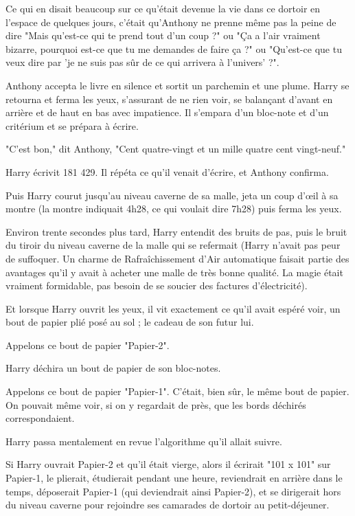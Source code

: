 Ce qui en disait beaucoup sur ce qu'était devenue la vie dans ce dortoir en l'espace de quelques jours, c'était qu'Anthony ne prenne même pas la peine de dire "Mais qu'est-ce qui te prend tout d'un coup ?" ou "Ça a l'air vraiment bizarre, pourquoi est-ce que tu me demandes de faire ça ?" ou "Qu'est-ce que tu veux dire par 'je ne suis pas sûr de ce qui arrivera à l'univers' ?".

Anthony accepta le livre en silence et sortit un parchemin et une plume. Harry se retourna et ferma les yeux, s'assurant de ne rien voir, se balançant d'avant en arrière et de haut en bas avec impatience. Il s'empara d'un bloc-note et d'un critérium et se prépara à écrire.

"C'est bon," dit Anthony, "Cent quatre-vingt et un mille quatre cent vingt-neuf."

Harry écrivit 181 429. Il répéta ce qu'il venait d'écrire, et Anthony confirma.

Puis Harry courut jusqu'au niveau caverne de sa malle, jeta un coup d'œil à sa montre (la montre indiquait 4h28, ce qui voulait dire 7h28) puis ferma les yeux.

Environ trente secondes plus tard, Harry entendit des bruits de pas, puis le bruit du tiroir du niveau caverne de la malle qui se refermait (Harry n'avait pas peur de suffoquer. Un charme de Rafraîchissement d'Air automatique faisait partie des avantages qu'il y avait à acheter une malle de très bonne qualité. La magie était vraiment formidable, pas besoin de se soucier des factures d'électricité).

Et lorsque Harry ouvrit les yeux, il vit exactement ce qu'il avait espéré voir, un bout de papier plié posé au sol ; le cadeau de son futur lui.

Appelons ce bout de papier "Papier-2".

Harry déchira un bout de papier de son bloc-notes.

Appelons ce bout de papier "Papier-1". C'était, bien sûr, le même bout de papier. On pouvait même voir, si on y regardait de près, que les bords déchirés correspondaient.

Harry passa mentalement en revue l'algorithme qu'il allait suivre.

Si Harry ouvrait Papier-2 et qu'il était vierge, alors il écrirait "101 x 101" sur Papier-1, le plierait, étudierait pendant une heure, reviendrait en arrière dans le temps, déposerait Papier-1 (qui deviendrait ainsi Papier-2), et se dirigerait hors du niveau caverne pour rejoindre ses camarades de dortoir au petit-déjeuner.

